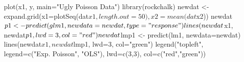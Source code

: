 \begin{Schunk}
\begin{Sinput}
 plot(x1, y, main="Ugly Poisson Data")
 library(rockchalk)
 newdat <- expand.grid(x1=plotSeq(dat$x1, length.out=50), x2=mean(dat$x2))
 newdat$p1 <- predict(glm1, newdata=newdat, type="response")
 lines(newdat$x1, newdat$p1, lwd=3, col="red")
 newdat$lmp1 <- predict(lm1, newdata=newdat)
 lines(newdat$x1, newdat$lmp1, lwd=3, col="green")
 legend("topleft", legend=c("Exp. Poisson", "OLS"), lwd=c(3,3), col=c("red","green"))
 
\end{Sinput}
\end{Schunk}

